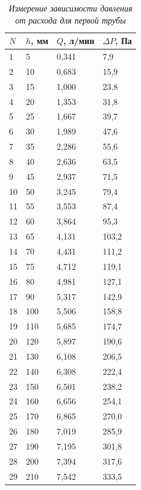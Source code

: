 \documentclass[a4paper,12pt]{article}
\begin{document}
\begin{table}[!h]
    \centering
    \begin{tabular}{|l|l|l|l|}
    \hline
        $N$ & $h$, мм & $Q$, л/мин & $\Delta P$, Па  \\ \hline
        1 & 5 & 0,341 & 7,9  \\ \hline
        2 & 10 & 0,683 & 15,9  \\ \hline
        3 & 15 & 1,000 & 23,8  \\ \hline
        4 & 20 & 1,353 & 31,8  \\ \hline
        5 & 25 & 1,667 & 39,7  \\ \hline
        6 & 30 & 1,989 & 47,6  \\ \hline
        7 & 35 & 2,286 & 55,6  \\ \hline
        8 & 40 & 2,636 & 63,5  \\ \hline
        9 & 45 & 2,937 & 71,5  \\ \hline
        10 & 50 & 3,245 & 79,4  \\ \hline
        11 & 55 & 3,553 & 87,4  \\ \hline
        12 & 60 & 3,864 & 95,3  \\ \hline
        13 & 65 & 4,131 & 103,2  \\ \hline
        14 & 70 & 4,431 & 111,2  \\ \hline
        15 & 75 & 4,712 & 119,1  \\ \hline
        16 & 80 & 4,981 & 127,1  \\ \hline
        17 & 90 & 5,317 & 142,9  \\ \hline
        18 & 100 & 5,506 & 158,8  \\ \hline
        19 & 110 & 5,685 & 174,7  \\ \hline
        20 & 120 & 5,897 & 190,6  \\ \hline
        21 & 130 & 6,108 & 206,5  \\ \hline
        22 & 140 & 6,308 & 222,4  \\ \hline
        23 & 150 & 6,501 & 238,2  \\ \hline
        24 & 160 & 6,656 & 254,1  \\ \hline
        25 & 170 & 6,865 & 270,0  \\ \hline
        26 & 180 & 7,019 & 285,9  \\ \hline
        27 & 190 & 7,195 & 301,8  \\ \hline
        28 & 200 & 7,394 & 317,6  \\ \hline
        29 & 210 & 7,542 & 333,5  \\ \hline
    \end{tabular}\caption{\textit{Измерение зависимости давления от расхода для первой трубы}}\label{table:q-1}
\end{table}
\end{document}
